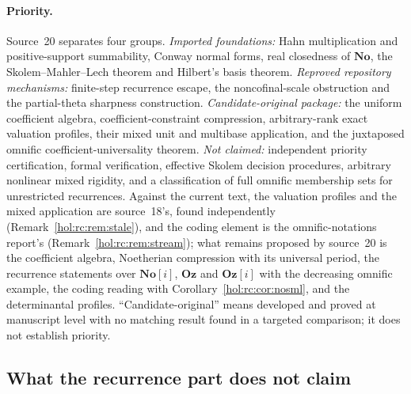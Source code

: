 \documentclass[11pt]{article}
\numberwithin{equation}{section}
\theoremstyle{definition}
\theoremstyle{remark}
\newcommand{\No}{\mathbf{No}}
\newcommand{\Oz}{\mathbf{Oz}}
\begin{document}
\paragraph{Priority.}
Source~20 separates four groups. \emph{Imported foundations:} Hahn
multiplication and positive-support summability, Conway normal forms, real
closedness of $\No$, the Skolem--Mahler--Lech theorem and Hilbert's basis
theorem. \emph{Reproved repository mechanisms:} finite-step recurrence escape,
the noncofinal-scale obstruction and the partial-theta sharpness construction.
\emph{Candidate-original package:} the uniform coefficient algebra,
coefficient-constraint compression, arbitrary-rank exact valuation profiles,
their mixed unit and multibase application, and the juxtaposed omnific
coefficient-universality theorem. \emph{Not claimed:} independent priority
certification, formal verification, effective Skolem decision procedures,
arbitrary nonlinear mixed rigidity, and a classification of full omnific
membership sets for unrestricted recurrences. Against the current text, the
valuation profiles and the mixed application are source~18's, found
independently (Remark~\ref{hol:rc:rem:stale}), and the coding element is the
omnific-notations report's (Remark~\ref{hol:rc:rem:stream}); what remains
proposed by source~20 is the coefficient algebra, Noetherian compression with
its universal period, the recurrence statements over $\No[i]$, $\Oz$ and
$\Oz[i]$ with the decreasing omnific example, the coding reading with
Corollary~\ref{hol:rc:cor:nosml}, and the determinantal profiles.
``Candidate-original'' means developed and proved at manuscript level with no
matching result found in a targeted comparison; it does not establish
priority.

\subsection{What the recurrence part does not claim}
\label{hol:rc:sub:nonclaims}
\end{document}
